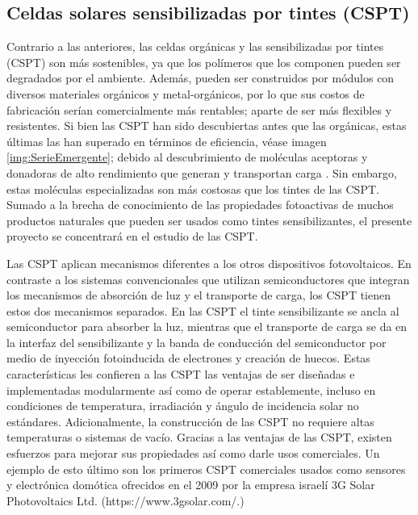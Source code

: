 \subsection{Celdas solares sensibilizadas por tintes (CSPT)}

Contrario a las anteriores, las celdas orgánicas y las sensibilizadas por tintes (CSPT) son más sostenibles, ya que los polímeros que los componen pueden ser degradados por el ambiente. Además, pueden ser construidos por módulos con diversos materiales orgánicos y metal-orgánicos, por lo que sus costos de fabricación serían comercialmente más rentables; aparte de ser más flexibles y resistentes. Si bien las CSPT han sido descubiertas antes que las orgánicas, estas últimas las han superado en términos de eficiencia, véase imagen \ref{img:SerieEmergente}; debido al descubrimiento de moléculas aceptoras y donadoras de alto rendimiento que generan y transportan carga \cite{li2022recent}. Sin embargo, estas moléculas especializadas son más costosas que los tintes de las CSPT. Sumado a la brecha de conocimiento de las propiedades fotoactivas de muchos productos naturales que pueden ser usados como tintes sensibilizantes, el presente proyecto se concentrará en el estudio de las CSPT. 


Las CSPT aplican mecanismos diferentes a los otros dispositivos fotovoltaicos. En contraste a los sistemas convencionales que utilizan semiconductores que integran los mecanismos de absorción de luz y el transporte de carga, los CSPT tienen estos dos mecanismos separados. En las CSPT el tinte sensibilizante se ancla al semiconductor para absorber la luz, mientras que el transporte de carga se da en la interfaz del sensibilizante y la banda de conducción del semiconductor por medio de inyección fotoinducida de electrones y creación de huecos. Estas características les confieren a las CSPT las ventajas de ser diseñadas e implementadas modularmente \cite{hashmi2011review} así como de operar establemente, incluso en condiciones de temperatura, irradiación y ángulo de incidencia solar no estándares. Adicionalmente, la construcción de las CSPT no requiere altas temperaturas o sistemas de vacío. Gracias a las ventajas de las CSPT, existen esfuerzos para mejorar sus propiedades así como darle usos comerciales. Un ejemplo de esto último son los primeros CSPT comerciales usados como sensores y electrónica domótica ofrecidos en el 2009 por la empresa israelí 3G Solar Photovoltaics Ltd. (https://www.3gsolar.com/.)


